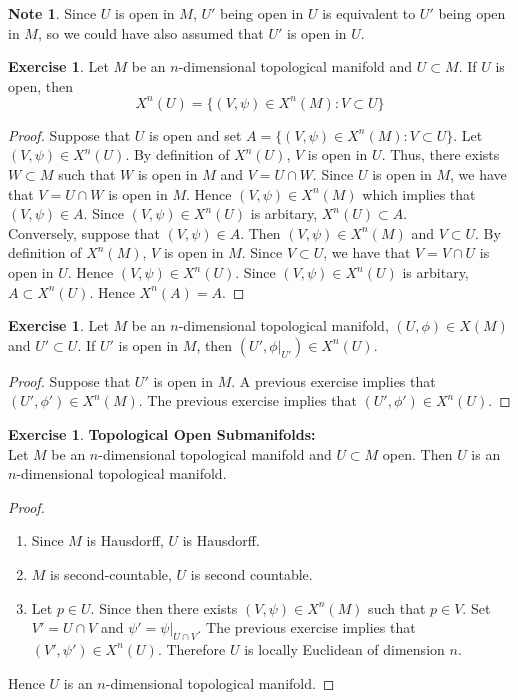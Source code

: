 \documentclass{book}
\theoremstyle{definition}
\newtheorem{note}[definition]{Note}
\newtheorem{ex}[definition]{Exercise}
\DeclareMathOperator*{\0}{\mbf{0}}
\DeclareMathOperator*{\1}{\mbf{1}}
\newcommand{\tbf}[1]{\textbf{#1}}
\begin{document}
	\begin{note}
		Since $U$ is open in $M$, $U'$ being open in $U$ is equivalent to $U'$ being open in $M$, so we could have also assumed that $U'$ is open in $U$.
	\end{note}
	
	\begin{ex}
		Let $M$ be an $n$-dimensional topological manifold and $U \subset M$. If $U$ is open, then 
		$$X^n(U) = \{(V, \psi) \in X^n(M): V \subset U\}$$
	\end{ex}
	
	\begin{proof}
		Suppose that $U$ is open and set $A = \{(V, \psi) \in X^n(M): V \subset U\}$. Let $(V, \psi) \in X^n(U)$. By definition of $X^n(U)$, $V$ is open in $U$. Thus, there exists $W \subset M$ such that $W$ is open in $M$ and $V = U \cap W$. Since $U$ is open in $M$, we have that $V = U \cap W$ is open in $M$. Hence $(V, \psi) \in X^n(M)$ which implies that $(V, \psi) \in A$. Since $(V, \psi) \in X^n(U)$ is arbitary, $X^n(U) \subset A$. \\
		Conversely, suppose that $(V, \psi) \in A$. Then $(V, \psi) \in X^n(M)$ and $V \subset U$. By definition of $X^n(M)$, $V$ is open in $M$. Since $V \subset U$, we have that $V = V \cap U$ is open in $U$. Hence $(V, \psi) \in X^n(U)$. Since $(V, \psi) \in X^n(U)$ is arbitary, $A \subset X^n(U)$. Hence $X^n(A) = A$.
	\end{proof}
	
	\begin{ex}
		Let $M$ be an $n$-dimensional topological manifold, $(U, \phi) \in X(M)$ and $U' \subset U$. If $U'$ is open in $M$, then $(U', \phi|_{U'}) \in X^n(U)$. 
	\end{ex}
	
	\begin{proof}
		Suppose that $U'$ is open in $M$. A previous exercise implies that $(U', \phi') \in X^n(M)$. The previous exercise implies that $(U', \phi') \in X^n(U)$.
	\end{proof}
	
	\begin{ex} \tbf{Topological Open Submanifolds:}\\
		Let $M$ be an $n$-dimensional topological manifold and $U \subset M$ open. Then $U$ is an $n$-dimensional topological manifold. 
	\end{ex}
	
	\begin{proof} \
		\begin{enumerate}
			\item Since $M$ is Hausdorff, $U$ is Hausdorff.
			\item $M$ is second-countable, $U$ is second countable. 
			\item Let $p \in U$. Since then there exists $(V, \psi) \in X^n(M)$ such that $p \in V$. Set $V' = U \cap V$ and $\psi' = \psi|_{U \cap V}$. The previous exercise implies that $(V', \psi') \in X^n(U)$. Therefore $U$ is locally Euclidean of dimension $n$.
		\end{enumerate}
		Hence $U$ is an $n$-dimensional topological manifold.
	\end{proof}
\end{document}
